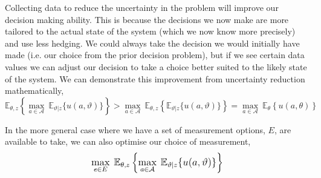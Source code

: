 Collecting data to reduce the uncertainty in the problem will improve our decision making ability. This is because the decisions we now make are more tailored to the actual state of the system (which we now know more precisely) and use less hedging. We could always take the decision we would initially have made (i.e. our choice from the prior decision problem), but if we see certain data values we can adjust our decision to take a choice better suited to the likely state of the system. We can demonstrate this improvement from uncertainty reduction mathematically,
\begin{equation} \label{eq:methodology-pdp-inequality}
    \mathbb{E}_{\theta,z} \left\lbrace \max_{a \in \mathcal{A}} \: \mathbb{E}_{\vartheta|z}\lbrace u(a,\vartheta) \rbrace \right\rbrace
    >
    \max_{a \in \mathcal{A}} \: \mathbb{E}_{\theta,z} \left\lbrace \mathbb{E}_{\vartheta|z}\lbrace u(a,\vartheta) \rbrace \right\rbrace
    =
    \max_{a \in \mathcal{A}} \: \mathbb{E}_{\theta} \left\lbrace u(a,\theta) \right\rbrace
\end{equation}
\hspace{1.5em}

In the more general case where we have a set of measurement options, $E$, are available to take, we can also optimise our choice of measurement,
\begin{equation} \label{eq:methodology-preposterior-optimisation}
    \mathlarger{
    \max_{e \in E} \: \mathbb{E}_{\theta,z} \left\lbrace \max_{a \in \mathcal{A}} \: \mathbb{E}_{\vartheta|z}\lbrace u(a,\vartheta) \rbrace \right\rbrace
    }
\end{equation}
\hfill \\


